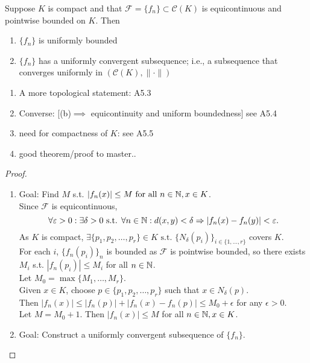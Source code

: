 \begin{thm}[25]
	Suppose $K$ is compact and that $\mathscr{F}=\{f_{n}\} \subset \mathscr{C}(K)$ is equicontinuous and pointwise bounded on $K$. Then
	\begin{enumerate}
		\item $\{f_{n}\} $ is uniformly bounded
		\item $\{f_{n}\}$ has a uniformly convergent subsequence; i.e., a subsequence that converges uniformly in $(\mathscr{C}(K), \|\cdot\|)$
	\end{enumerate}
	\begin{remark}
		\begin{enumerate}[label=\arabic*.]
			\item  A more topological statement: A5.3
			\item Converse: [(b)$\implies$ equicontinuity and uniform boundedness] see A5.4
			\item need for compactness of $K$: see A5.5
			\item good theorem/proof to master..
		\end{enumerate}
	\end{remark}
	\begin{proof}
		\begin{enumerate}
			\item Goal: Find $M$ s.t. $\left|f_{n}(x)\right| \le M	 \text{ for all } n \in \mathbb{N}, x \in K$.\\
			      Since $\mathscr{F}$ is equicontinuous,
			      \[
				      \forall{\varepsilon> 0}: \exists{\delta > 0} \text{ s.t. } \forall{n \in \ensuremath{\mathbb{N}}}: d(x,y)<\delta \Rightarrow \left|f_{n}(x)-f_{n}(y)\right|<\varepsilon
				      .\]
			      As $K$ is compact, $\exists{\{p_1,p_2,\ldots ,p_{r}\} \in K} \text{ s.t. } \{N_{\delta}(p_{i})\}_{i \in \{1,\ldots,r\}}$ covers $K$.\\
			      For each $i$, $\{f_{n}(p_{i})\}_n$ is bounded as $\mathscr{F}$ is pointwise bounded, so there exists $M_i$ s.t. $\left|f_{n}(p_{i})\right|\le M_i$ for all $n \in \mathbb{N}$.\\
			      Let $M_0=\max\{M_1,\ldots ,M_r\}$. \\
			      Given $x \in K$, choose $p \in \{p_1,p_2,\ldots ,p_r\}$ such that $x \in N_{\delta}(p)$.\\
			      Then $\left|f_{n}(x)\right|\le \left|f_{n}(p)\right|+\left|f_{n}(x)-f_{n}(p)\right| \le M_0+\epsilon$ for any $\epsilon>0$.\\
			      Let $M=M_0+1$. Then $\left|f_{n}(x)\right|\le M$ for all $n \in \mathbb{N}, x \in K$.
			\item Goal: Construct a uniformly convergent subsequence of $\{ {f}_{n}\}$.\\

\end{enumerate}
\end{proof}
\end{thm}
